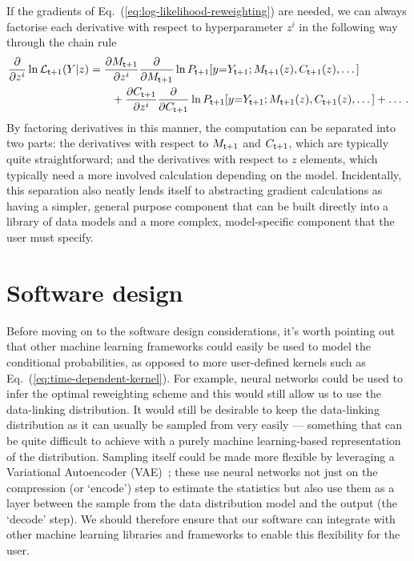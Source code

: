 If the gradients of Eq.~(\ref{eq:log-likelihood-reweighting}) are needed, we can always factorise each derivative with respect to hyperparameter $z^i$ in the following way through the chain rule
\begin{align}
\frac{\partial}{\partial z^i}\ln {\cal L}_{{\sf t}+1}(Y \vert z) &= \frac{\partial M_{{\sf t}+1}}{\partial z^i}\frac{\partial}{\partial M_{{\sf t}+1}}\ln P_{{\sf t}+1}[y{=}Y_{{\sf t}+1};M_{{\sf t}+1}(z),C_{{\sf t}+1}(z),\dots ] \nonumber \\ 
&\qquad + \frac{\partial C_{{\sf t}+1}}{\partial z^i}\frac{\partial }{\partial C_{{\sf t}+1}}\ln P_{{\sf t}+1}[y{=}Y_{{\sf t}+1};M_{{\sf t}+1}(z),C_{{\sf t}+1}(z),\dots ] + \dots  \,. \label{eq:log-likelihood-reweighting-grad}
\end{align}
By factoring derivatives in this manner, the computation can be separated into two parts: the derivatives with respect to $M_{{\sf t}+1}$ and $C_{{\sf t}+1}$, which are typically quite straightforward; and the derivatives with respect to $z$ elements, which typically need a more involved calculation depending on the model. Incidentally, this separation also neatly lends itself to abstracting gradient calculations as having a simpler, general purpose component that can be built directly into a library of data models and a more complex, model-specific component that the user must specify.


\section{\sffamily Software design}

Before moving on to the software design considerations, it's worth pointing out that other machine learning frameworks could easily be used to model the conditional probabilities, as opposed to more user-defined kernels such as Eq.~(\ref{eq:time-dependent-kernel}). For example, neural networks could be used to infer the optimal reweighting scheme and this would still allow us to use the data-linking distribution. It would still be desirable to keep the data-linking distribution as it can usually be sampled from very easily --- something that can be quite difficult to achieve with a purely machine learning-based representation of the distribution. Sampling itself could be made more flexible by leveraging a Variational Autoencoder (VAE)~\cite{pinheiro2021variational}; these use neural networks not just on the compression (or `encode') step to estimate the statistics but also use them as a layer between the sample from the data distribution model and the output (the `decode' step). We should therefore ensure that our software can integrate with other machine learning libraries and frameworks to enable this flexibility for the user.

